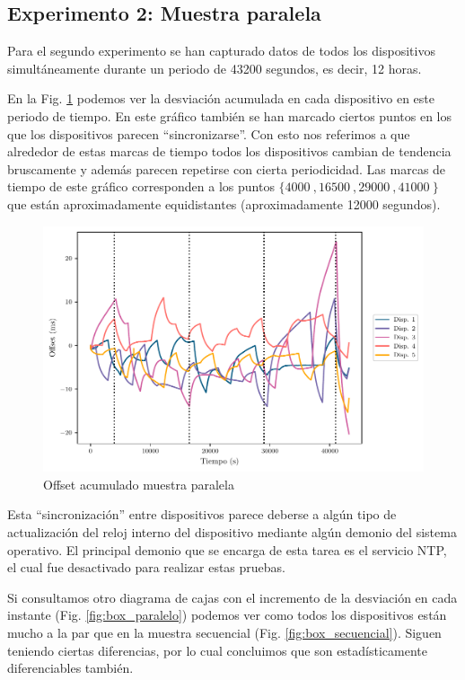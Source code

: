 \subsection{Experimento 2: Muestra paralela}

Para el segundo experimento se han capturado datos de todos los dispositivos simultáneamente durante un periodo de \SI{43200}{} segundos, es decir, \SI{12}{} horas.

En la Fig. \ref{fig:off_acu_paralelo} podemos ver la desviación acumulada en cada dispositivo en este periodo de tiempo. En este gráfico también se han marcado ciertos puntos en los que los dispositivos parecen ``sincronizarse''. Con esto nos referimos a que alrededor de estas marcas de tiempo todos los dispositivos cambian de tendencia bruscamente y además parecen repetirse con cierta periodicidad. Las marcas de tiempo de este gráfico corresponden a los puntos $\{\SI{4000}{},  \SI{16500}{}, \SI{29000}{}, \SI{41000}{}\}$ que están aproximadamente equidistantes (aproximadamente \SI{12000}{} segundos).

\begin{figure}
    \centering
    \includegraphics[scale=0.65]{../Python/plots/parallel/offset_plot}
    \caption{Offset acumulado muestra paralela}
    \label{fig:off_acu_paralelo}
\end{figure}

Esta ``sincronización'' entre dispositivos parece deberse a algún tipo de actualización del reloj interno del dispositivo mediante algún demonio del sistema operativo. El principal demonio que se encarga de esta tarea es el servicio NTP, el cual fue desactivado para realizar estas pruebas. 

Si consultamos otro diagrama de cajas con el incremento de la desviación en cada instante (Fig. \ref{fig:box_paralelo}) podemos ver como todos los dispositivos están mucho a la par que en la muestra secuencial (Fig. \ref{fig:box_secuencial}).  Siguen teniendo ciertas diferencias, por lo cual concluimos que son estadísticamente diferenciables también.

